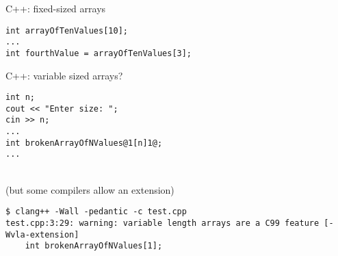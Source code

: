 \begin{frame}[fragile,label=cppArray]{C++: fixed-sized arrays}
\lstset{language=C++,style=small}
\begin{lstlisting}
int arrayOfTenValues[10];
...
int fourthValue = arrayOfTenValues[3];
\end{lstlisting}
\end{frame}

\begin{frame}[fragile,label=vlas]{C++: variable sized arrays?}
\begin{lstlisting}
int n;
cout << "Enter size: ";
cin >> n;
...
int brokenArrayOfNValues@1[n]1@;
...
\end{lstlisting}
 \\
(but some compilers allow an extension)
\begin{Verbatim}[fontsize=\small]
$ clang++ -Wall -pedantic -c test.cpp
test.cpp:3:29: warning: variable length arrays are a C99 feature [-Wvla-extension]
    int brokenArrayOfNValues[1];
\end{Verbatim}
\end{frame}


